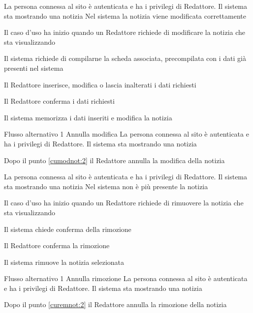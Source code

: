 
{}
{La persona connessa al sito è autenticata e ha i privilegi di Redattore. Il sistema sta mostrando una notizia}
{Nel sistema la notizia viene modificata correttamente}
{\begin{enumCU}
	\item Il caso d'uso ha inizio quando un Redattore richiede di modificare la notizia che sta visualizzando
	\item Il sistema richiede di compilarne la scheda associata, precompilata con i dati già presenti nel sistema 
	\item Il Redattore inserisce, modifica o lascia inalterati i dati richiesti\label{cumodnot:2}
	\item Il Redattore conferma i dati richiesti
	\item Il sistema memorizza i dati inseriti e modifica la notizia
\end{enumCU}}
%
{Flusso alternativo 1}%
{Annulla modifica}%
{La persona connessa al sito è autenticata e ha i privilegi di Redattore. Il sistema sta mostrando una notizia}%
{\postNulle}%
{\begin{enumCU}
		\item Dopo il punto \ref{cumodnot:2} il Redattore annulla la modifica della notizia
\end{enumCU}}%


{}
{La persona connessa al sito è autenticata e ha i privilegi di Redattore. Il sistema sta mostrando una notizia}
{Nel sistema non è più presente la notizia}
{\begin{enumCU}
	\item Il caso d'uso ha inizio quando un Redattore richiede di rimuovere la notizia che sta visualizzando
	\item Il sistema chiede conferma della rimozione\label{curemnot:2}
	\item Il Redattore conferma la rimozione
	\item Il sistema rimuove la notizia selezionata
\end{enumCU}}
%
{Flusso alternativo 1}%
{Annulla rimozione}%
{La persona connessa al sito è autenticata e ha i privilegi di Redattore. Il sistema sta mostrando una notizia}%
{\postNulle}%
{\begin{enumCU}
		\item Dopo il punto \ref{curemnot:2} il Redattore annulla la rimozione della notizia
	\end{enumCU}}%

